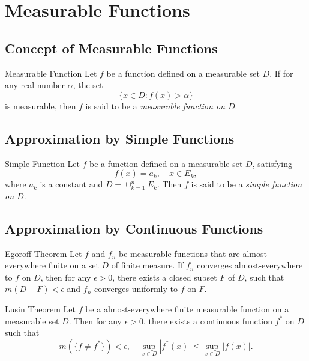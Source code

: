 

\section{Measurable Functions}

\subsection{Concept of Measurable Functions}

\begin{definition}{Measurable Function}{}
  Let $f$ be a function defined on a measurable set $D$.
  If for any real number $\alpha$, the set
  \begin{equation}
    \{x \in D: f(x) > \alpha\}
  \end{equation}
  is measurable, then $f$ is said to be a \emph{measurable function on $D$}.
\end{definition}

\subsection{Approximation by Simple Functions}

\begin{definition}{Simple Function}{}
  Let $f$ be a function defined on a measurable set $D$, satisfying
  \begin{equation}
    f(x) = a_k, \quad x \in E_k,
  \end{equation}
  where $a_k$ is a constant and $D = \cup _{k = 1}^n E_k$.
  Then $f$ is said to be a \emph{simple function on $D$}.
\end{definition}

\subsection{Approximation by Continuous Functions}

\begin{theorem}{Egoroff Theorem}{}
  Let $f$ and $f_n$ be measurable functions that are almost-everywhere finite
  on a set $D$ of finite measure.
  If $f_n$ converges almost-everywhere to $f$ on $D$,
  then for any $\epsilon > 0$, there exists a closed subset $F$ of $D$,
  such that $m(D - F) < \epsilon$
  and $f_n$ converges uniformly to $f$ on $F$.
\end{theorem}

\begin{theorem}{Lusin Theorem}{}
  Let $f$ be a almost-everywhere finite measurable function on a measurable set
  $D$.
  Then for any $\epsilon > 0$, there exists a continuous function $f^{\ast}$ on
  $D$ such that
  \begin{equation}
    m(\{f \neq f^{\ast}\}) < \epsilon, \quad
    \sup \limits_{x \in D} |f^{\ast}(x)| \leq \sup \limits_{x \in D} |f(x)|.
  \end{equation}
\end{theorem}

